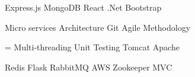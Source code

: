 \documentclass[]{rinkal_resume}
\begin{document}
 \textbullet{} 
 \textbullet{} 
 \textbullet{} 
 \textbullet{} 
Express.js \textbullet{} 
MongoDB \textbullet{} 
React \textbullet{} 
.Net \textbullet{} 
Bootstrap 

 \textbullet{} 
 \textbullet{} 
Micro services Architecture \textbullet{} 
Git \textbullet{} 
Agile Methodology \textbullet{}

\newlength\boxwid
\settowidth{\boxwid}{\indent\hspace{0.5cm}}
\hspace{3.25cm} \hangindent=\boxwid 
Multi-threading \textbullet{} 
Unit Testing \textbullet{} 
Tomcat \textbullet{} 
Apache 

  \textbullet{} 
Redis \textbullet{} 
Flask \textbullet{} 
RabbitMQ \textbullet{}  
AWS \textbullet{} 
Zookeeper \textbullet{} 
MVC 
\smallsectionsep
\end{document}
